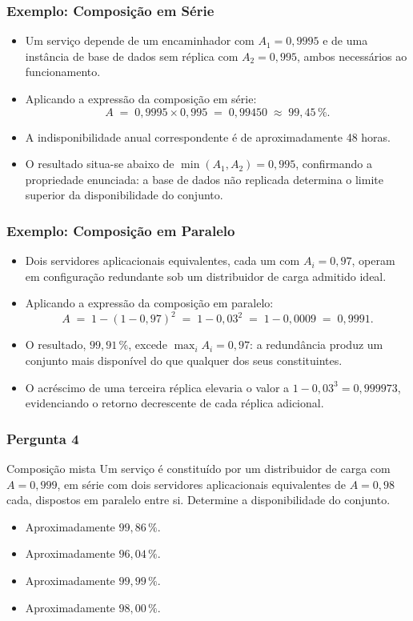 \documentclass[aspectratio=169]{beamer}
\begin{document}
\begin{frame}
\frametitle{Exemplo: Composição em Série}
\begin{itemize}
    \setlength\itemsep{0.35cm}
    \item Um serviço depende de um encaminhador com $A_1 = 0{,}9995$ e de uma instância de base de dados sem réplica com $A_2 = 0{,}995$, ambos necessários ao funcionamento.
    \item Aplicando a expressão da composição em série:
    \[
      A \;=\; 0{,}9995 \times 0{,}995 \;=\; 0{,}99450 \;\approx\; 99{,}45\,\% .
    \]
    \item A indisponibilidade anual correspondente é de aproximadamente 48 horas.
    \item O resultado situa-se abaixo de $\min(A_1, A_2) = 0{,}995$, confirmando a propriedade enunciada: a base de dados não replicada determina o limite superior da disponibilidade do conjunto.
\end{itemize}
\end{frame}

\begin{frame}
\frametitle{Exemplo: Composição em Paralelo}
\begin{itemize}
    \setlength\itemsep{0.35cm}
    \item Dois servidores aplicacionais equivalentes, cada um com $A_i = 0{,}97$, operam em configuração redundante sob um distribuidor de carga admitido ideal.
    \item Aplicando a expressão da composição em paralelo:
    \[
      A \;=\; 1 - (1-0{,}97)^2 \;=\; 1 - 0{,}03^2 \;=\; 1 - 0{,}0009 \;=\; 0{,}9991 .
    \]
    \item O resultado, $99{,}91\,\%$, excede $\max_i A_i = 0{,}97$: a redundância produz um conjunto mais disponível do que qualquer dos seus constituintes.
    \item O acréscimo de uma terceira réplica elevaria o valor a $1 - 0{,}03^3 = 0{,}999973$, evidenciando o retorno decrescente de cada réplica adicional.
\end{itemize}
\end{frame}

\begin{frame}
\frametitle{Pergunta 4}
\begin{pergunta}{Composição mista}
Um serviço é constituído por um distribuidor de carga com $A = 0{,}999$, em série com dois servidores aplicacionais equivalentes de $A = 0{,}98$ cada, dispostos em paralelo entre si. Determine a disponibilidade do conjunto.
\begin{itemize}
    \item[A)] Aproximadamente $99{,}86\,\%$.
    \item[B)] Aproximadamente $96{,}04\,\%$.
    \item[C)] Aproximadamente $99{,}99\,\%$.
    \item[D)] Aproximadamente $98{,}00\,\%$.
\end{itemize}
\end{pergunta}
\end{frame}
\end{document}
